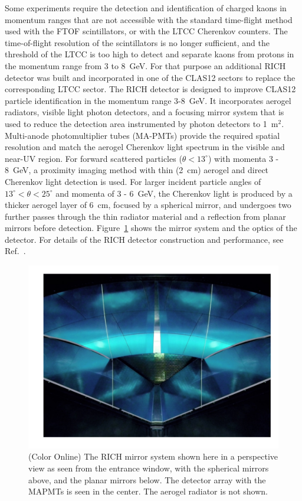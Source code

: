 \documentclass[final,3p,twocolumn]{elsarticle}
\begin{document}
Some experiments require the detection and identification of charged kaons in momentum ranges that are not 
accessible with the standard time-flight method used with the FTOF scintillators, or with the LTCC Cherenkov
counters. The time-of-flight resolution of the scintillators is no longer sufficient, and the threshold of the LTCC
is too high to detect and separate kaons from protons in the momentum range from 3 to 8~GeV. For that purpose
an additional RICH detector was built and incorporated in one of the CLAS12 sectors to replace the corresponding
LTCC sector. The RICH detector is designed to improve CLAS12 particle identification in the momentum range
3-8~GeV. It incorporates aerogel radiators, visible light photon detectors, and a focusing mirror system that is
used to reduce the detection area instrumented by photon detectors to 1~m$^2$.  Multi-anode photomultiplier
tubes (MA-PMTs) provide the required spatial resolution and match the aerogel Cherenkov light spectrum in the
visible and near-UV region. For forward scattered particles ($\theta < 13^\circ$) with momenta 3 - 8~GeV, a
proximity imaging method with thin (2~cm) aerogel and direct Cherenkov light detection is used. For larger incident
particle angles of $13^\circ < \theta < 25^\circ$ and momenta of 3 - 6~GeV, the Cherenkov light is produced by a
thicker aerogel layer of 6~cm, focused by a spherical mirror, and undergoes two further passes through the
thin radiator material and a reflection from planar mirrors before detection. Figure~\ref{rich} shows the mirror
system and the optics of the detector. For details of the RICH detector construction and performance, see
Ref.~\cite{RICH}.

\begin{figure}[htbp!]
\centerline{\includegraphics[width=2.0\columnwidth]{rich-mirrors.png}}
\caption{(Color Online) The RICH mirror system shown here in a perspective view as seen from the entrance 
window, with the spherical mirrors above, and
the planar mirrors below. The detector array with the MAPMTs is seen in the center. The aerogel radiator is not shown. }
\label{rich}
\end{figure}
\end{document}
